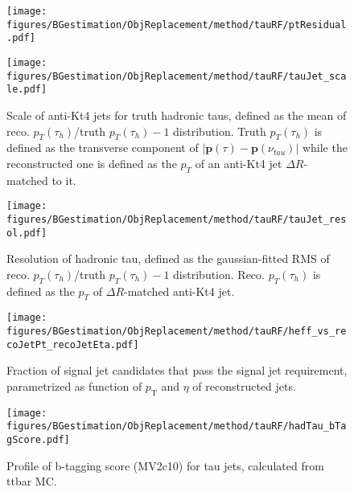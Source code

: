 \clearpage
\begin{figure}[htbp]
  \begin{center}
      \texttt{[image: figures/BGestimation/ObjReplacement/method/tauRF/ptResidual.pdf]} 
      \caption{}
      \label{fig::ObjReaplce::tau_ptResidual}
    \begin{minipage}[t]{.45\textwidth}
      \centering        
      \texttt{[image: figures/BGestimation/ObjReplacement/method/tauRF/tauJet\_scale.pdf]} 
      \caption{Scale of anti-Kt4 jets for truth hadronic taus, defined as the mean of reco. $p_T(\tau_{h})$/truth $p_T(\tau_{h})-1$ distribution. Truth $p_T(\tau_{h})$ is defined as the transverse component of $|\bm{p}(\tau)-\bm{p}(\nu_{tau})|$ while the reconstructed one is defined as the $p_T$ of an anti-Kt4 jet $\Delta R$-matched to it.}
      \label{fig::ObjReaplce::tau_scale}
    \end{minipage}
    \hfill
    \begin{minipage}[t]{.45\textwidth}
      \centering
      \texttt{[image: figures/BGestimation/ObjReplacement/method/tauRF/tauJet\_resol.pdf]}
      \caption{Resolution of hadronic tau, defined as the gaussian-fitted RMS of reco. $p_T(\tau_{h})$/truth $p_T(\tau_{h})-1$ distribution. Reco. $p_T(\tau_{h})$ is defined as the $p_T$ of $\Delta R$-matched anti-Kt4 jet.}
      \label{fig::ObjReaplce::tau_resol}
    \end{minipage}
  \end{center}  
\end{figure}
\clearpage
\begin{figure}[htbp]
  \begin{center}
    \begin{minipage}[t]{.45\textwidth}
      \centering
      \texttt{[image: figures/BGestimation/ObjReplacement/method/tauRF/heff\_vs\_recoJetPt\_recoJetEta.pdf]}
      \caption{Fraction of signal jet candidates that pass the signal jet requirement, parametrized as function of $p_{\mathrm{T}}$ and $\eta$ of reconstructed jets.}
      \label{fig::ObjReaplce::effJVT}
    \end{minipage}
    \hfill
    \begin{minipage}[t]{.45\textwidth}
      \centering
      \texttt{[image: figures/BGestimation/ObjReplacement/method/tauRF/hadTau\_bTagScore.pdf]}
      \caption{Profile of b-tagging score (MV2c10) for tau jets, calculated from ttbar MC.}
      \label{fig::ObjReaplce::tau_bTagScore}
    \end{minipage}
  \end{center}
\end{figure}
